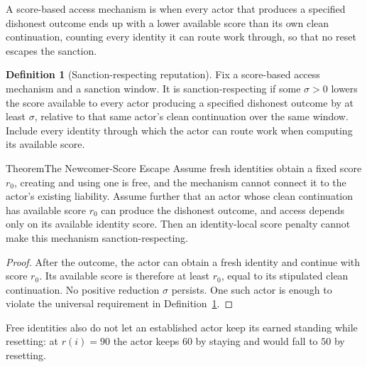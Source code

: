 \documentclass[11pt,a4paper]{article}
\theoremstyle{definition}
\newtheorem{definition}{Definition}[section]
\begin{document}
A score-based access mechanism is  when every
actor that produces a specified dishonest outcome ends up with a lower
available score than its own clean continuation, counting every identity it
can route work through, so that no reset escapes the sanction.

\begin{definition}[Sanction-respecting reputation]\label{def:sanction-respecting}
Fix a score-based access mechanism and a sanction window. It is sanction-respecting if some $\sigma>0$ lowers the score available to every actor producing a specified dishonest outcome by at least $\sigma$, relative to that same actor's clean continuation over the same window. Include every identity through which the actor can route work when computing its available score.
\end{definition}

\begin{pdclaim}{Theorem}{The Newcomer-Score Escape}
\label{thm:necessity}
Assume fresh identities obtain a fixed score $r_0$, creating and using one is free, and the mechanism cannot connect it to the actor's existing liability. Assume further that an actor whose clean continuation has available score $r_0$ can produce the dishonest outcome, and access depends only on its available identity score. Then an identity-local score penalty cannot make this mechanism sanction-respecting.
\end{pdclaim}
\begin{proof}
After the outcome, the actor can obtain a fresh identity and continue with score $r_0$. Its available score is therefore at least $r_0$, equal to its stipulated clean continuation. No positive reduction $\sigma$ persists. One such actor is enough to violate the universal requirement in Definition~\ref{def:sanction-respecting}.
\end{proof}

Free identities also do not let an established actor keep its earned standing
while resetting: at $r(i)=90$ the actor keeps $60$ by staying and would fall to
$50$ by resetting.
\end{document}
